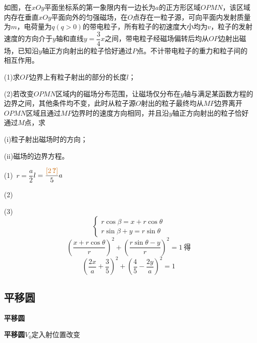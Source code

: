\begin{problem}[25.（19分）]
如图，在$xOy$平面坐标系的第一象限内有一边长为$a$的正方形区域$OPMN$，该区域内存在垂直$xOy$平面向外的匀强磁场，在$O$点存在一粒子源，可向平面内发射质量为$m$，电荷量为$q(q>0)$的带电粒子，所有粒子的初速度大小均为$v$，粒子的发射速度的方向介于$y$轴和直线$y=\dfrac34x$之间，带电粒子经磁场偏转后均从$OP$边射出磁场，已知沿$y$轴正方向射出的粒子恰好通过$P$点。不计带电粒子的重力和粒子间的相互作用。

(1)求$OP$边界上有粒子射出的部分的长度$l$；

(2)若改变$OPMN$区域内的磁场分布范围，让磁场仅分布在$y$轴与满足某函数方程的边界之间，其他条件均不变，此时从粒子源$O$射出的粒子最终均从$MP$边界离开$OPMN$区域且通过$MP$边界时的速度方向相同，并且沿$y$轴正方向射出的粒子恰好通过$M$点，求

(i)粒子射出磁场时的方向；

(ii)磁场的边界方程。

\begin{solution}
(1)\ $r=\dfrac{a}{2}$\quad {}\quad $l=\dfrac{\unclear{2}}{5}a$

(2)\ \red{$\theta=2\alpha$}




(3)
{\color{red!75!black}
\[
\begin{cases}
r\cos\beta=x+r\cos\theta\\
r\sin\beta+y=r\sin\theta
\end{cases}
\]
\[
\left(\frac{x+r\cos\theta}{r}\right)^{2}+\left(\frac{r\sin\theta-y}{r}\right)^{2}=1\ \text{得}
\]
\[
\left(\frac{2x}{a}+\frac35\right)^{2}+\left(\frac45-\frac{2y}{a}\right)^{2}=1
\]
}
\end{solution}
\end{problem}

\subsection{平移圆}
\textbf{平移圆}

\textbf{平移圆}\quad $V_0$定\quad 入射位置改变

